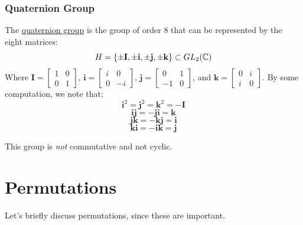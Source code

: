 \documentclass[letterpaper]{article}
\begin{document}
\subsubsection{Quaternion Group}
The \underline{quaternion group} is the group of order 8 that can be represented by the eight matrices: 
\[H = \{\pm \mathbf{I}, \pm \mathbf{i}, \pm \mathbf{j}, \pm \mathbf{k}\} \subset GL_{2}(\mathbb{C})\]
Where $\mathbf{I} = \begin{bmatrix}
    1 & 0 \\ 0 & 1
\end{bmatrix}$, $\mathbf{i} = \begin{bmatrix}
    i & 0 \\ 0 & -i
\end{bmatrix}$, $\mathbf{j} = \begin{bmatrix}
    0 & 1 \\ -1 & 0 
\end{bmatrix}$, and $\mathbf{k} = \begin{bmatrix}
    0 & i \\ i & 0
\end{bmatrix}$. By some computation, we note that: 
\[\mathbf{i}^2 = \mathbf{j}^2 = \mathbf{k}^2 = -\mathbf{I}\]
\[\mathbf{i}\mathbf{j} = -\mathbf{j}\mathbf{i} = \mathbf{k}\]
\[\mathbf{j}\mathbf{k} = -\mathbf{k}\mathbf{j} = \mathbf{i}\]
\[\mathbf{k}\mathbf{i} = -\mathbf{i}\mathbf{k} = \mathbf{j}\]


This group is \emph{not} commutative and not cyclic. 









\newpage 
\section{Permutations}
Let's briefly discuss permutations, since these are important.
\end{document}
